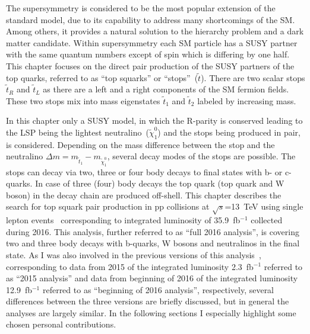 \clearpage

\setcounter{secnumdepth}{4}
\setcounter{secnumdepth}{4}


The supersymmetry is considered to be the most popular extension of the standard model, due to its capability to address many shortcomings of the SM. Among others, it provides a natural solution to the hierarchy problem and a dark matter candidate. Within supersymmetry each SM particle has a SUSY partner with the same quantum numbers except of spin which is differing by one half. This chapter focuses on the direct pair production of the SUSY partners of the top quarks, referred to as ``top squarks'' or ``stops''~($\tilde{t}$). There are two scalar stops $\tilde{t}_{R}$ and  $\tilde{t}_{L}$ as there are a left and a right components of the SM fermion fields. These two stops mix into mass eigenstates $\tilde{t}_{1}$ and $\tilde{t}_{2}$ labeled by increasing mass. 

In this chapter only a SUSY model, in which the R-parity is conserved leading to the LSP being the lightest neutralino~($\tilde{\chi}^{0}_{1}$) and the stops being produced  in pair, is considered. Depending on the mass difference between the stop and the neutralino $\Delta m = m_{\tilde{t}_{1}} - m_{\tilde{\chi}^{0}_{1}}$, several decay modes of the stops are possible. The stops can decay via two, three or four body decays to final states with b- or c-quarks. In case of three (four) body decays the top quark (top quark and W boson) in the decay chain are produced off-shell. This chapter describes the search for top squark pair production in pp collisions at $\sqrt{s}$=13~TeV using single lepton events~\cite{Sirunyan:2017xse} corresponding to integrated luminosity of 35.9~fb$^{-1}$ collected during 2016. This analysis, further referred to as ``full 2016 analysis'', is covering two and three body decays with b-quarks, W bosons and neutralinos in the final state. As I was also involved in the previous versions of this analysis~\cite{Sirunyan:2016jpr, CMS:2016vew}, corresponding to data from 2015 of the integrated luminosity 2.3~fb$^{-1}$ referred to as ``2015 analysis'' and data from beginning of 2016 of the integrated luminosity 12.9~fb$^{-1}$ referred to as ``beginning of 2016 analysis'', respectively, several differences between the three versions are briefly discussed, but in general the analyses are largely similar. In the following sections I especially highlight some chosen personal contributions.

